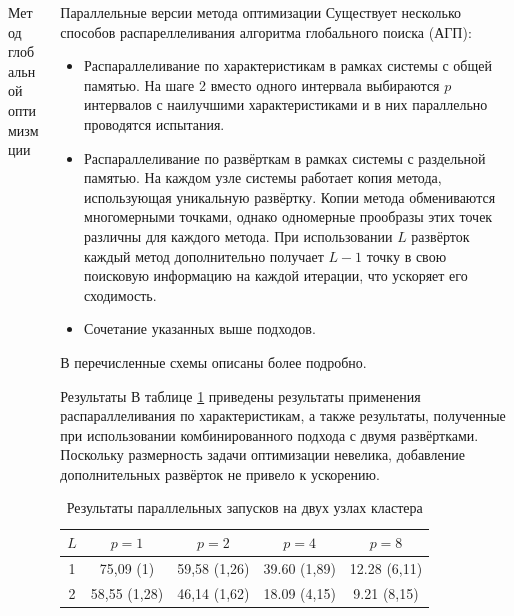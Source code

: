 \documentclass{beamer}
\begin{document}
\begin{frame}[t]
\begin{columns}[t]
\begin{column}[t]{0.48\paperwidth}
\begin{block}{Метод глобальной оптимизмции}
            \end{block}
        \end{column}
        \begin{column}[t]{0.48\paperwidth}
          \begin{block}{Параллельные версии метода оптимизации}
            Существует несколько способов распареллеливания алгоритма глобального поиска (АГП):
            \begin{itemize}
              \justifying
              \item Распараллеливание по характеристикам в рамках системы с общей памятью.
              На шаге 2 вместо одного интервала выбираются \(p\) интервалов с наилучшими характеристиками и в них параллельно проводятся испытания.
              \item Распараллеливание по развёрткам в рамках системы с раздельной памятью. На каждом узле системы работает копия метода, использующая
              уникальную развёртку. Копии метода обмениваются многомерными точками, однако одномерные прообразы этих точек различны для каждого метода.
              При использовании \(L\) развёрток каждый метод дополнительно получает \(L-1\) точку в свою поисковую информацию на каждой итерации, что
              ускоряет его сходимость.
              \item Сочетание указанных выше подходов.
            \end{itemize}
          В \cite{optParallelBook} перечисленные схемы описаны более подробно.
          \end{block}
          \begin{block}{Результаты}
            В таблице \ref{tab:parallelResults} приведены результаты применения распараллеливания по характеристикам, а также
            результаты, полученные при использовании комбинированного подхода с двумя развёртками.
            Поскольку размерность задачи оптимизации невелика, добавление дополнительных развёрток не привело к ускорению.

            \begin{table}[h]
            \caption{Результаты параллельных запусков на двух узлах кластера}
            \label{tab:parallelResults}
            \begin{tabular}{c|cccc}
              $L$ & $p=1$  & $p=2$ & $p=4$ & $p=8$\\
              \hline
              1  &  75,09 (1) & 59,58 (1,26) & 39.60 (1,89) & 12.28 (6,11) \\
              2  &  58,55 (1,28) & 46,14 (1,62) & 18.09 (4,15) & 9.21 (8,15) \\
              \hline
            \end{tabular}
            \end{table}


\end{block}
\end{column}
\end{columns}
\end{frame}
\end{document}
